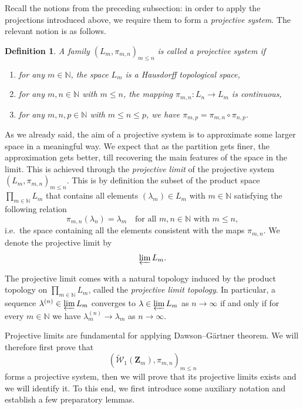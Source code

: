 \documentclass[12pt,twoside,a4paper]{article}
\newtheorem{definition}[theorem]{Definition}
\newcommand{\DG}{Dawson--G\"artner }
\newcommand{\Space}{\mathbf{Z}}
\newcommand{\UGraphon}{\widetilde{\mathcal{W}}_1}
\begin{document}
Recall the notions from the preceding subsection: in order to apply the projections introduced above, we require them to form a \emph{projective system}. The relevant notion is as follows.

\begin{definition}\label{def:projsyst}
    A family $(L_m, \pi_{m,n})_{m \leq n}$ is called a \emph{projective system} if
\begin{enumerate}
\renewcommand{\labelenumi}{\roman{enumi})}
    \item for any $m \in \mathbb{N}$, the space $L_m$ is a Hausdorff topological space,
    \item for any $m, n \in \mathbb{N}$ with $m \leq n$, the mapping $\pi_{m,n} : L_n \to L_m$ is continuous,
    \item for any $m, n, p \in \mathbb{N}$ with $m \leq n \leq p$, we have $\pi_{m,p} = \pi_{m,n} \circ \pi_{n,p}$. 
\end{enumerate}
\end{definition}
As we already said, the aim of a projective system is to approximate some larger space in a meaningful way. We expect that as the partition gets finer, the approximation gets better, till recovering the main features of the space in the limit. This is achieved through the \emph{projective limit} of the projective system $(L_m, \pi_{m,n})_{m \leq n}$. This is by definition the subset of the product space $\prod_{m \in \mathbb{N}} L_m$ that contains all elements $(\lambda_m)\in L_m$ with $m \in \mathbb{N}$ satisfying the following relation
\[
\pi_{m,n}(\lambda_n) = \lambda_m \quad \text{for all } m, n \in \mathbb{N} \text{ with } m \leq n,
\]
i.e.\ the space containing all the elements consistent with the maps $\pi_{m,n}$.
We denote the projective limit by
\[
\varprojlim L_m.
\]

The projective limit comes with a natural topology induced by the product topology on $\prod_{m \in \mathbb{N}} L_m$, called the \emph{projective limit topology}. 
In particular, a sequence $\lambda^{(n)} \in \varprojlim L_m$ converges to $\lambda \in \varprojlim L_m$ as $n \to \infty$ if and only if for every $m \in \mathbb{N}$ we have $\lambda^{(n)}_m \to \lambda_m$ as $n \to \infty$.

Projective limits are fundamental for applying \DG theorem. We will therefore first prove that
\[
(\UGraphon(\Space_m), \pi_{m,n})_{m \leq n}
\]
forms a projective system, then we will prove that its projective limits exists and we will identify it. To this end, we first introduce some auxiliary notation and establish a few preparatory lemmas.
\end{document}
